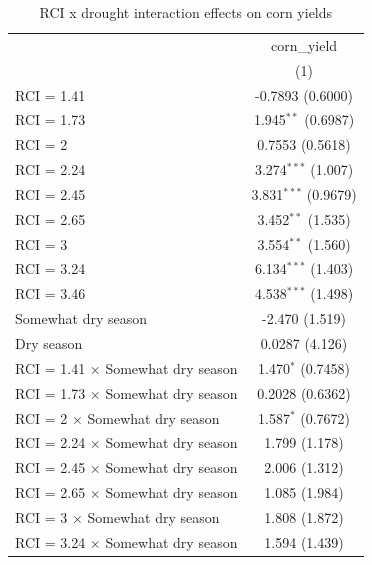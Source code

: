 
\begin{table}[H]
   \caption{\label{tab:corn_rci_vpd} RCI x drought interaction effects on corn yields}
   \bigskip
   \centering
   \scriptsize
   \begin{tabular}{lc}
      \toprule
                                               & corn\_yield\\   
                                               & (1)\\  
      \midrule 
      RCI = 1.41                               & -0.7893 (0.6000)\\   
      RCI = 1.73                               & 1.945$^{**}$ (0.6987)\\   
      RCI = 2                                  & 0.7553 (0.5618)\\   
      RCI = 2.24                               & 3.274$^{***}$ (1.007)\\   
      RCI = 2.45                               & 3.831$^{***}$ (0.9679)\\   
      RCI = 2.65                               & 3.452$^{**}$ (1.535)\\   
      RCI = 3                                  & 3.554$^{**}$ (1.560)\\   
      RCI = 3.24                               & 6.134$^{***}$ (1.403)\\   
      RCI = 3.46                               & 4.538$^{***}$ (1.498)\\   
      Somewhat dry season                      & -2.470 (1.519)\\   
      Dry season                               & 0.0287 (4.126)\\   
      RCI = 1.41 $\times$ Somewhat dry season  & 1.470$^{*}$ (0.7458)\\   
      RCI = 1.73 $\times$ Somewhat dry season  & 0.2028 (0.6362)\\   
      RCI = 2 $\times$ Somewhat dry season     & 1.587$^{*}$ (0.7672)\\   
      RCI = 2.24 $\times$ Somewhat dry season  & 1.799 (1.178)\\   
      RCI = 2.45 $\times$ Somewhat dry season  & 2.006 (1.312)\\   
      RCI = 2.65 $\times$ Somewhat dry season  & 1.085 (1.984)\\   
      RCI = 3 $\times$ Somewhat dry season     & 1.808 (1.872)\\   
      RCI = 3.24 $\times$ Somewhat dry season  & 1.594 (1.439)\\   

\end{tabular}
\end{table}
